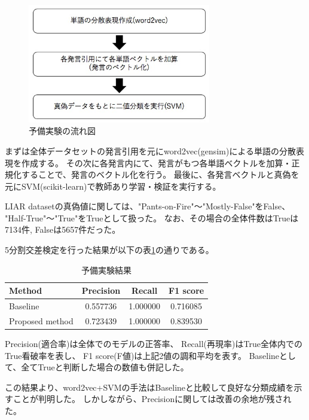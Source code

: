 \documentclass[twocolumn, a4paper, uplatex]{UECIEresume}
\begin{document}
\begin{figure}[h]
  \begin{center}
    \includegraphics[width=8cm]{fig_ex.jpg}
    \caption{予備実験の流れ図}
    \label{fig:nagare}
  \end{center}
\end{figure}

まずは全体データセットの発言引用を元にword2vec(gensim)による単語の分散表現を作成する。
その次に各発言内にて、発言がもつ各単語ベクトルを加算・正規化することで、発言のベクトル化を行う。
最後に、各発言ベクトルと真偽を元にSVM(scikit-learn)で教師あり学習・検証を実行する。


LIAR datasetの真偽値に関しては、"Pants-on-Fire"〜"Mostly-False"をFalse、
"Half-True"〜"True"をTrueとして扱った。
なお、その場合の全体件数はTrueは7134件, Falseは5657件だった。

5分割交差検定を行った結果が以下の表\ref{tb:result}の通りである。

\begin{table}[h]
  \begin{center}
    \caption{予備実験結果}
    \label{tb:result}
    \begin{tabular}{l c c c}
      \hline
      Method & Precision & Recall & F1 score \\
      \hline
      Baseline & 0.557736 & 1.000000 & 0.716085\\
      Proposed method & 0.723439 & 1.000000 & 0.839530\\
      \hline
    \end{tabular}
  \end{center}
\end{table}

Precision(適合率)は全体でのモデルの正答率、
Recall(再現率)はTrue全体内でのTrue看破率を表し、
F1 score(F値)は上記2値の調和平均を表す。
Baselineとして、全てTrueと判断した場合の数値も併記した。

この結果より、word2vec+SVMの手法はBaselineと比較して良好な分類成績を示すことが判明した。
しかしながら、Precisionに関しては改善の余地が残された。
\end{document}
